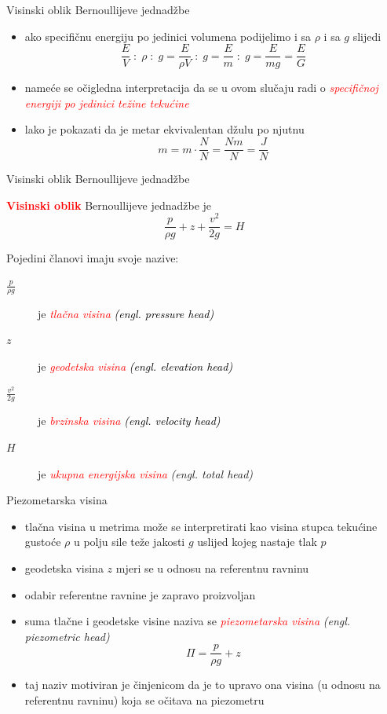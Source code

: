\documentclass[croatian]{beamer}
\begin{document}
\begin{frame}{Visinski oblik Bernoullijeve jednadžbe}

\begin{itemize}
\item ako specifičnu energiju po jedinici volumena podijelimo i sa $\rho$
i sa $g$ slijedi
\[
\frac{E}{V}\;:\;\rho\;:\;g=\frac{E}{\rho V}\;:\;g=\frac{E}{m}\;:\;g=\frac{E}{mg}=\frac{E}{G}
\]
\item nameće se očigledna interpretacija da se u ovom slučaju radi o \textcolor{red}{\emph{specifičnoj
energiji po jedinici težine tekućine}}
\item lako je pokazati da je metar ekvivalentan džulu po njutnu
\[
m=m\cdot\frac{N}{N}=\frac{Nm}{N}=\frac{J}{N}
\]
\end{itemize}
\end{frame}

\begin{frame}{Visinski oblik Bernoullijeve jednadžbe}

\textbf{\textcolor{red}{Visinski oblik}} Bernoullijeve jednadžbe je
\[
\frac{p}{\rho g}+z+\frac{v^{2}}{2g}=H
\]
\begin{block}{Pojedini članovi imaju svoje nazive:}
\begin{description}
\item [{$\frac{p}{\rho g}$}] je\textcolor{red}{\emph{ tlačna visina }}\textcolor{black}{\emph{(engl.
pressure head)}}
\item [{$z$}] je \textcolor{red}{\emph{geodetska visina }}\textcolor{black}{\emph{(engl.
elevation head)}}
\item [{$\frac{v^{2}}{2g}$}] je \textcolor{red}{\emph{brzinska visina
}}\textcolor{black}{\emph{(engl. velocity head)}}
\item [{$H$}] je \textcolor{red}{\emph{ukupna energijska visina}} \emph{(engl.
total head)}
\end{description}
\end{block}
\end{frame}

\begin{frame}{Piezometarska visina}

\begin{itemize}
\item tlačna visina u metrima može se interpretirati kao visina stupca tekućine
gustoće $\rho$ u polju sile teže jakosti $g$ uslijed kojeg nastaje
tlak $p$
\item geodetska visina $z$ mjeri se u odnosu na referentnu ravninu
\item odabir referentne ravnine je zapravo proizvoljan
\item suma tlačne i geodetske visine naziva se \textcolor{red}{\emph{piezometarska
visina }}\emph{(engl. piezometric head)}
\[
\Pi=\frac{p}{\rho g}+z
\]
\item taj naziv motiviran je činjenicom da je to upravo ona visina (u odnosu
na referentnu ravninu) koja se očitava na piezometru
\end{itemize}
\end{frame}
\end{document}
